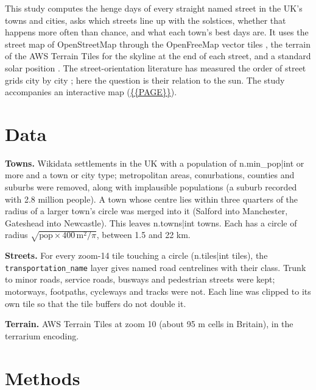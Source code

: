 \documentclass[11pt,a4paper]{article}
\begin{document}
This study computes the henge days of every straight named street in the UK's towns and cities, asks which streets line up with the solstices, whether that happens more often than chance, and what each town's best days are. It uses the street map of OpenStreetMap \citep{osm} through the OpenFreeMap vector tiles \citep{ofm}, the terrain of the AWS Terrain Tiles \citep{terrain} for the skyline at the end of each street, and a standard solar position \citep{spencer,bennett}. The street-orientation literature has measured the order of street grids city by city \citep{boeing}; here the question is their relation to the sun. The study accompanies an interactive map (\url{{{PAGE}}}).

\section{Data}
\textbf{Towns.} Wikidata \citep{wikidata} settlements in the UK with a population of {{n.min_pop|int}} or more and a town or city type; metropolitan areas, conurbations, counties and suburbs were removed, along with implausible populations (a suburb recorded with 2.8 million people). A town whose centre lies within three quarters of the radius of a larger town's circle was merged into it (Salford into Manchester, Gateshead into Newcastle). This leaves {{n.towns|int}} towns. Each has a circle of radius $\sqrt{\mathrm{pop} \times 400\,\mathrm{m}^2/\pi}$, between 1.5 and 22 km.

\textbf{Streets.} For every zoom-14 tile touching a circle ({{n.tiles|int}} tiles), the \texttt{transportation\_name} layer gives named road centrelines with their class. Trunk to minor roads, service roads, busways and pedestrian streets were kept; motorways, footpaths, cycleways and tracks were not. Each line was clipped to its own tile so that the tile buffers do not double it.

\textbf{Terrain.} AWS Terrain Tiles at zoom 10 (about 95 m cells in Britain), in the terrarium encoding.

\section{Methods}
\end{document}

